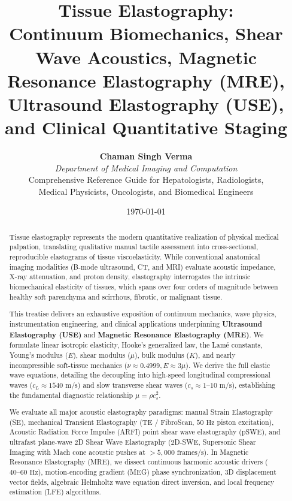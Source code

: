 \documentclass[11pt,a4paper]{article}
\title{\textbf{\huge Tissue Elastography:}\\[0.4em]
\Large Continuum Biomechanics, Shear Wave Acoustics, Magnetic Resonance Elastography (MRE), Ultrasound Elastography (USE), and Clinical Quantitative Staging}
\author{\textbf{Chaman Singh Verma} \\
\textit{Department of Medical Imaging and Computation} \\
\small \textsf{Comprehensive Reference Guide for Hepatologists, Radiologists,}\\[0.2em]
\small \textsf{Medical Physicists, Oncologists, and Biomedical Engineers}}
\date{\today}
\begin{document}
\maketitle

\begin{abstract}
Tissue elastography represents the modern quantitative realization of physical medical palpation, translating qualitative manual tactile assessment into cross-sectional, reproducible elastograms of tissue viscoelasticity. While conventional anatomical imaging modalities (B-mode ultrasound, CT, and MRI) evaluate acoustic impedance, X-ray attenuation, and proton density, elastography interrogates the intrinsic biomechanical elasticity of tissues, which spans over four orders of magnitude between healthy soft parenchyma and scirrhous, fibrotic, or malignant tissue.

This treatise delivers an exhaustive exposition of continuum mechanics, wave physics, instrumentation engineering, and clinical applications underpinning \textbf{Ultrasound Elastography (USE)} and \textbf{Magnetic Resonance Elastography (MRE)}. We formulate linear isotropic elasticity, Hooke's generalized law, the Lamé constants, Young's modulus ($E$), shear modulus ($\mu$), bulk modulus ($K$), and nearly incompressible soft-tissue mechanics ($\nu \approx 0.4999, E \approx 3\mu$). We derive the full elastic wave equations, detailing the decoupling into high-speed longitudinal compressional waves ($c_L \approx 1540\text{ m/s}$) and slow transverse shear waves ($c_s \approx 1\text{--}10\text{ m/s}$), establishing the fundamental diagnostic relationship $\mu = \rho c_s^2$.

We evaluate all major acoustic elastography paradigms: manual Strain Elastography (SE), mechanical Transient Elastography (TE / FibroScan, $50\text{ Hz}$ piston excitation), Acoustic Radiation Force Impulse (ARFI) point shear wave elastography (pSWE), and ultrafast plane-wave 2D Shear Wave Elastography (2D-SWE, Supersonic Shear Imaging with Mach cone acoustic pushes at $> 5,000\text{ frames/s}$). In Magnetic Resonance Elastography (MRE), we dissect continuous harmonic acoustic drivers ($40\text{--}60\text{ Hz}$), motion-encoding gradient (MEG) phase synchronization, 3D displacement vector fields, algebraic Helmholtz wave equation direct inversion, and local frequency estimation (LFE) algorithms.


\end{abstract}
\end{document}
